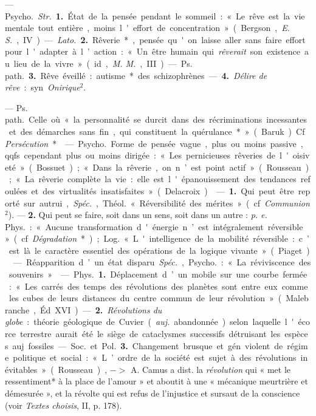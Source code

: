 \begin{itemize}[leftmargin=1cm, label=, itemsep=1pt]
 — \si{Psycho.} {\it Str.} {\bf 1.} État de la pensée pendant le
sommeil : « Le rêve est la vie mentale tout entière, moins l'effort de
concentration » (Bergson, {\it E. S.}, IV). — {\it Lato.} {\bf 2.} Rêverie*,
pensée qu'on laisse aller sans faire effort pour l'adapter à l’action : « Un
être humain qui {\it rêverait} son existence au lieu de la vivre... » (id.,
{\it M. M.}, III).

— \si{Ps. path.} {\bf 3.} Rêve éveillé : autisme* des schizophrènes. —
{\bf 4.} {\it Délire de rêve} : syn. {\it Onirique}$^2$.

 — \si{Ps. path.} Celle où « la personnalité se
durcit dans des récriminations incessantes et des démarches sans fin, qui
constituent la quérulance* » (Baruk). Cf. {\it Persécution}*.

 — \si{Psycho.} Forme de pensée vague, plus ou moins passive,
qqfs. cependant plus ou moins dirigée : « Les pernicieuses rêveries de
l'oisiveté » (Bossuet) ; « Dans la rêverie, on n’est point actif
» (Rousseau) ; « La rêverie complète la vie : elle est l'épanouissement des
tendances refoulées et des virtualités insatisfaites » (Delacroix).

 — {\bf 1.} Qui peut être reporté sur autrui, {\it Spéc.},
\si{Théol.} « Réversibilité des mérites » (cf. {\it Communion}$^2$). —
{\bf 2.} Qui peut se faire, soit dans un sens, soit dans un autre :
{\it p. e.} \si{Phys.} : « Aucune transformation d'énergie n’est
intégralement réversible » (cf. {\it Dégradation}*) ; \si{Log.} «
L'intelligence de la mobilité réversible : c’est là le caractère essentiel
des opérations de la logique vivante » (Piaget).

 — Réapparition d’un état disparu. {\it Spéc.},
\si{Psycho.} : « La réviviscence des souvenirs. »

 — \si{Phys.} {\bf 1.} Déplacement d’un mobile sur une courbe
fermée : « Les carrés des temps des révolutions des planètes sont entre eux
comme les cubes de leurs distances du centre commun de leur révolution
» (Malebranche, Éd. XVI) — {\bf 2.} {\it Révolutions du globe} : théorie
géologique de Cuvier ({\it auj.} abandonnée) selon laquelle l'écorce
terrestre aurait été le siège de cataclysmes successifs détruisant les
espèces auj. fossiles.

— \si{Soc.} et \si{Pol.} {\bf 3.} Changement brusque et gén. violent de
régime politique et social : « L’ordre de la société est sujet à des
révolutions inévitables » (Rousseau), $->$ A. Camus a dist. la {\it
révolution} qui « met le ressentiment* à la place de l'amour » et aboutit à
une « mécanique meurtrière et démesurée », et la révolte qui est refus de
l'injustice et sursaut de la conscience (voir {\it Textes choisis}, II, p.
178).


\end{itemize}
